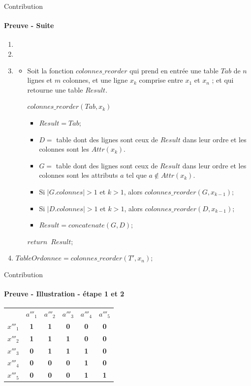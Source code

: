 \documentclass{beamer}
\begin{document}
  \begin{frame}{Contribution}
  \framesubtitle{Preuve - Suite}

\begin{enumerate}
\item 
\item 
\item
  \begin{itemize}
	\item Soit la fonction  $colonnes\_reorder$ qui prend en entrée une table $Tab$ de $n$ lignes et $m$ colonnes, et une ligne $x_k$ comprise entre $x_1$ et $x_n$ ; et qui retourne
 une table $Result$.

		  $colonnes\_reorder(Tab, x_k)$
		  \begin{itemize}
		   \item $Result = Tab;$
		   \item $D =$ table dont des lignes sont ceux de $Result$ dans leur ordre et les colonnes sont les $Attr(x_k)$.
		   \item $G =$ table dont des lignes sont ceux de $Result$ dans leur ordre et les colonnes sont les attributs $a$ tel que $a \notin Attr(x_k)$.
		   \item Si $|G.colonnes| > 1$ et $k > 1$, alors $colonnes\_reorder(G, x_{k-1});$
		   \item Si $|D.colonnes| > 1$ et $k > 1$, alors $colonnes\_reorder(D, x_{k-1});$
           \item $Result = concatenate (G, D);$ 
		  \end{itemize}
		  $return$~$Result;$
  \end{itemize}
\item $TableOrdonnee = colonnes\_reorder(T', x_n);$
\end{enumerate}

  \end{frame}

  \begin{frame}{Contribution}
  \framesubtitle{Preuve - Illustration - étape 1 et 2}
\begin{table}[htb]
  \centering
\begin{tabular}{lccccc}
 & $a'''_1$ & $a'''_2$ & $a'''_3$ & $a'''_4$ & $a'''_5$\\
$x'''_1$ & \textbf{1} & \textbf{1} & \textbf{0} & \textbf{0} & \textbf{0}\\
$x'''_2$ & \textbf{1} & \textbf{1} & \textbf{1} & \textbf{0} & \textbf{0}\\
$x'''_3$ & \textbf{0} & \textbf{1} & \textbf{1} & \textbf{1} & \textbf{0}\\
$x'''_4$ & \textbf{0} & \textbf{0} & \textbf{0} & \textbf{1} & \textbf{0}\\
$x'''_5$ & \textbf{0} & \textbf{0} & \textbf{0} & \textbf{1} & \textbf{1}

\end{tabular}
\end{table}
  \end{frame}
\end{document}
